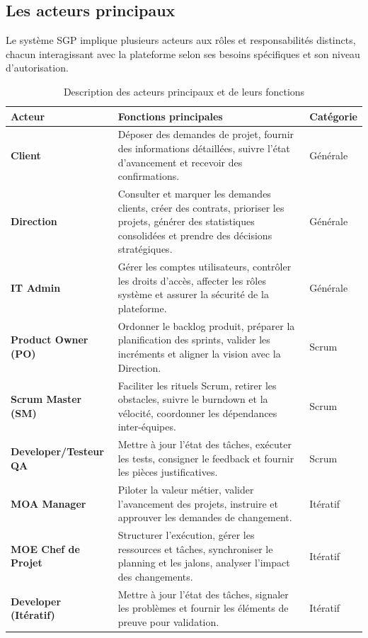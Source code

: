 \subsection{Les acteurs principaux}
\label{ssec:acteurs_principaux}

Le système SGP implique plusieurs acteurs aux rôles et responsabilités distincts, chacun interagissant avec la plateforme selon ses besoins spécifiques et son niveau d'autorisation.

\begin{table}[H]
    \centering
    \footnotesize
    \begin{tabular}{|p{2.5cm}|p{6.5cm}|p{2cm}|}
        \hline
        \textbf{Acteur} & \textbf{Fonctions principales} & \textbf{Catégorie} \\
        \hline
        \textbf{Client} & Déposer des demandes de projet, fournir des informations détaillées, suivre l'état d'avancement et recevoir des confirmations. & Générale \\
        \hline
        \textbf{Direction} & Consulter et marquer les demandes clients, créer des contrats, prioriser les projets, générer des statistiques consolidées et prendre des décisions stratégiques. & Générale \\
        \hline
        \textbf{IT Admin} & Gérer les comptes utilisateurs, contrôler les droits d'accès, affecter les rôles système et assurer la sécurité de la plateforme. & Générale \\
        \hline
        \textbf{Product Owner (PO)} & Ordonner le backlog produit, préparer la planification des sprints, valider les incréments et aligner la vision avec la Direction. & Scrum \\
        \hline
        \textbf{Scrum Master (SM)} & Faciliter les rituels Scrum, retirer les obstacles, suivre le burndown et la vélocité, coordonner les dépendances inter-équipes. & Scrum \\
        \hline
        \textbf{Developer/Testeur QA} & Mettre à jour l'état des tâches, exécuter les tests, consigner le feedback et fournir les pièces justificatives. & Scrum \\
        \hline
        \textbf{MOA Manager} & Piloter la valeur métier, valider l'avancement des projets, instruire et approuver les demandes de changement. & Itératif \\
        \hline
        \textbf{MOE Chef de Projet} & Structurer l'exécution, gérer les ressources et tâches, synchroniser le planning et les jalons, analyser l'impact des changements. & Itératif \\
        \hline
        \textbf{Developer (Itératif)} & Mettre à jour l'état des tâches, signaler les problèmes et fournir les éléments de preuve pour validation. & Itératif \\
        \hline
    \end{tabular}
    \caption{Description des acteurs principaux et de leurs fonctions}
    \label{tab:acteurs_principaux}
\end{table}


